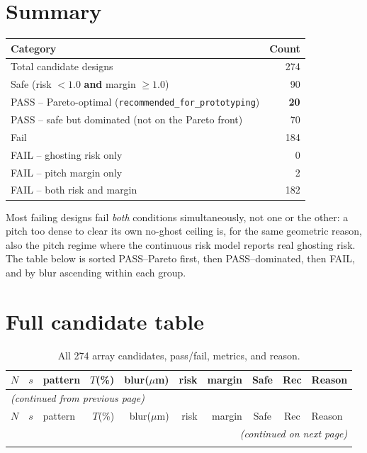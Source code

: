 \documentclass[9pt]{article}
\begin{document}
\section*{Summary}
\begin{center}
\begin{tabular}{lr}
\toprule
\textbf{Category} & \textbf{Count} \\
\midrule
Total candidate designs & 274 \\
\quad Safe (risk $<1.0$ \textbf{and} margin $\geq1.0$) & 90 \\
\quad\quad PASS -- Pareto-optimal (\texttt{recommended\_for\_prototyping}) & \textbf{20} \\
\quad\quad PASS -- safe but dominated (not on the Pareto front) & 70 \\
\quad Fail & 184 \\
\quad\quad FAIL -- ghosting risk only & 0 \\
\quad\quad FAIL -- pitch margin only & 2 \\
\quad\quad FAIL -- both risk and margin & 182 \\
\bottomrule
\end{tabular}
\end{center}
Most failing designs fail \emph{both} conditions simultaneously, not one or the other: a
pitch too dense to clear its own no-ghost ceiling is, for the same geometric reason, also
the pitch regime where the continuous risk model reports real ghosting risk. The table below
is sorted PASS--Pareto first, then PASS--dominated, then FAIL, and by blur ascending within
each group.

\section*{Full candidate table}
\begin{longtable}{rrlrrrrccp{4.2cm}}
\caption{All 274 array candidates, pass/fail, metrics, and reason.}\\
\toprule
$N$ & $s$ & pattern & $T$(\%) & blur($\mu$m) & risk & margin & Safe & Rec & Reason \\
\midrule
\endfirsthead
\multicolumn{10}{l}{\textit{(continued from previous page)}}\\
\toprule
$N$ & $s$ & pattern & $T$(\%) & blur($\mu$m) & risk & margin & Safe & Rec & Reason \\
\midrule
\endhead
\midrule
\multicolumn{10}{r}{\textit{(continued on next page)}}\\
\endfoot
\bottomrule
\endlastfoot

\end{longtable}
\end{document}
